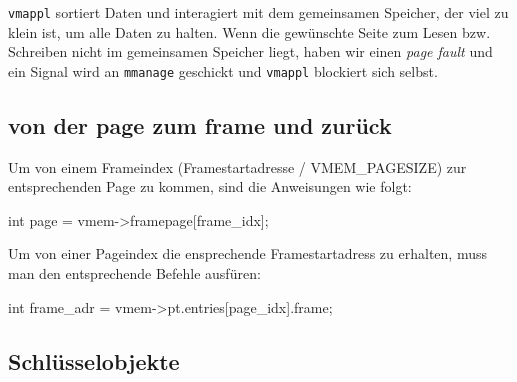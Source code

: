 \documentclass[
   draft=false
  ,paper=a4
  ,twoside=false
  ,fontsize=11pt
  ,headsepline
  ,BCOR10mm
  ,DIV11
  ,parskip=full+
]{scrartcl} %
\begin{document}
        \texttt{vmappl} sortiert Daten und interagiert mit dem gemeinsamen 
        Speicher, der viel zu klein ist, um alle Daten zu halten. Wenn die 
        gewünschte Seite zum Lesen bzw. Schreiben nicht im gemeinsamen 
        Speicher liegt, haben wir einen \textit{page fault} und ein Signal 
        wird an \texttt{mmanage} geschickt und \texttt{vmappl} blockiert sich
        selbst.

    \subsection{von der  page zum frame und zurück}
        Um von einem Frameindex (Framestartadresse / VMEM\_PAGESIZE) zur 
        entsprechenden Page zu kommen, sind die Anweisungen wie folgt:
        \begin{ccode}
            int page = vmem->framepage[frame_idx];
        \end{ccode}
        Um von einer Pageindex die ensprechende Framestartadress zu erhalten, 
        muss man den entsprechende Befehle ausfüren:
        \begin{ccode}
            int frame_adr = vmem->pt.entries[page_idx].frame;
        \end{ccode}

    \subsection{Schlüsselobjekte}
\end{document}
